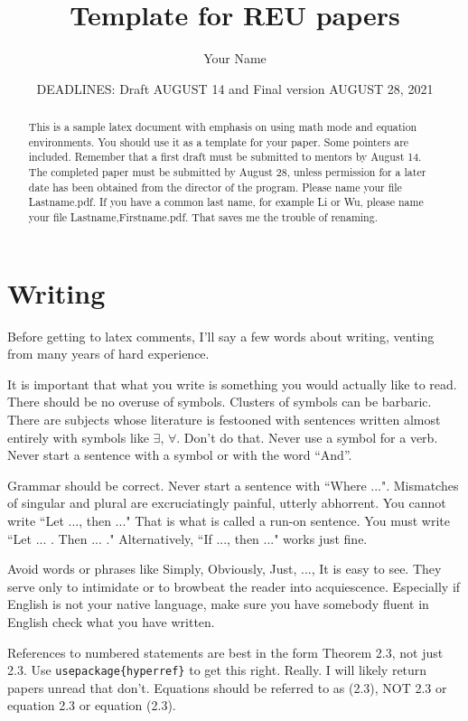 \documentclass[openany, amssymb, psamsfonts]{amsart}
\title{Template for REU papers}
\author{Your Name}
\date{DEADLINES: Draft AUGUST 14 and Final version AUGUST 28, 2021}
\theoremstyle{definition}
\numberwithin{equation}{section}
\begin{document}
\begin{abstract}

This is a sample latex document with emphasis on using math mode and
equation environments.  You should use it as a template for your paper.
Some pointers are included. 
Remember that a first draft must be submitted to mentors by August 14.  The completed paper must be submitted by August 28, unless  permission for a later date has been obtained from the director of the program.   Please  name your file  Lastname.pdf.  If you have a common last name, for example Li or Wu, please name your file Lastname,Firstname.pdf.  That saves me the trouble of renaming.


\end{abstract}

\maketitle

\tableofcontents

\section{Writing}  Before getting to latex comments, I'll say a few words about writing, venting from many years of hard experience. 

It is important that what you write is something you would actually like to read.  There should be no overuse of symbols.
Clusters of symbols can be barbaric.  There are subjects whose literature is festooned with sentences written almost entirely with symbols like $\exists$, $\forall$.  Don't do that. Never use a symbol for a verb.  Never start a sentence with a symbol or with the word ``And''.

Grammar should be correct.  Never start a sentence with ``Where ...".   
Mismatches of singular and plural are excruciatingly painful, utterly abhorrent.  You cannot write
``Let ..., then ..."  That is what is called a run-on sentence. You must write ``Let ... .  Then ... ."
Alternatively, ``If ..., then ..."  works just fine.

Avoid words or phrases like Simply, Obviously, Just, ..., It is easy to see.  They serve only to intimidate or to browbeat the reader into acquiescence. 
Especially if English is not your native language, make sure you have  somebody fluent in English check what you have written.     

References to numbered statements are best in the form Theorem 2.3, not just 2.3.  Use  \verb|usepackage{hyperref}| to get this right.  Really.  I will likely return papers unread that don't. 
Equations should be referred to as (2.3), NOT 2.3 or equation 2.3 or equation (2.3).
\end{document}
